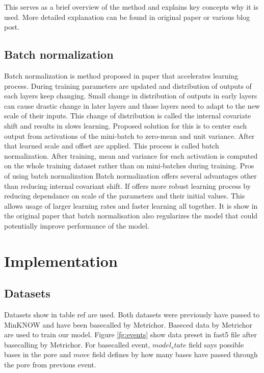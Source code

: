 \documentclass[times, utf8, diplomski, numeric, english]{fer}
\begin{document}
This serves as a brief overview of the method and explains key concepts why it is used. More detailed explanation can be found in original paper\cite{Graves:2006:CTC:1143844.1143891} or various blog post\cite{ctc-blog}.

\section{Batch normalization}
Batch normalization is method proposed in paper\cite{BNORM} that accelerates learning process. 
During training parameters are updated and distribution of outputs of each layers keep changing. Small change in distribution of outputs in early layers can cause drastic change in later layers and those layers need to adapt to the new scale of their inputs. This change of distribution is called the internal covariate shift and results in slows learning.
Proposed solution for this is to center each output from activations of the mini-batch to zero-mean and unit variance. After that learned scale and offset are applied. This process is called batch normalization. 
After training, mean and variance for each activation is computed on the whole training dataset rather than on mini-batches during training. 
Pros of using batch normalization 
Batch normalization offers several advantages other than reducing internal covariant shift. 
If offers more robust learning process by reducing dependance on scale of the parameters and their initial values. This allows usage of larger learning rates and faster learning all together. It is show in the original paper that batch normalisation also regularizes the model that could potentially improve performance of the model.

\chapter{Implementation}

\section{Datasets}

Datasets show in table ref are used. Both datasets were previously have passed to MinKNOW and have been basecalled by Metrichor.
Baseced data by Metrichor are used to train our model. Figure \ref{fg:events} show data preset in fast5 file after basecalling  by Metrichor. For basecalled event, $model_state$ field says possible bases in the pore and $move$ field defines by how many bases have passed through the pore from previous event. 
\end{document}
